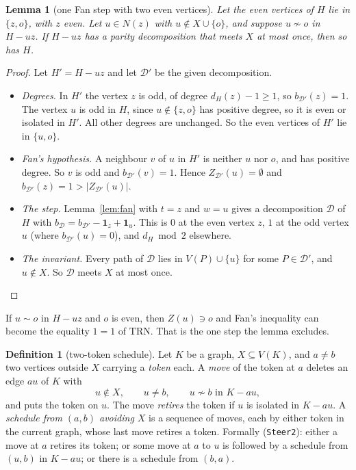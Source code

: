 \documentclass[11pt]{amsart}
\newtheorem{lemma}[theorem]{Lemma}
\theoremstyle{definition}
\newtheorem{definition}[theorem]{Definition}
\newcommand{\cD}{\mathcal D}
\newcommand{\lean}[1]{\quad{\footnotesize[Lean: \texttt{#1}]}}
\newcommand{\TRN}{\mathrm{TRN}}
\begin{document}
\begin{lemma}[one Fan step with two even vertices]\label{lem:step2}
Let the even vertices of $H$ lie in $\{z,o\}$, with $z$ even. Let $u\in N(z)$ with $u\notin X\cup
\{o\}$, and suppose $u\not\sim o$ in $H-uz$. If $H-uz$ has a parity decomposition that meets $X$ at
most once, then so has $H$.\lean{fan\_step\_two}
\end{lemma}

\begin{proof}
Let $H'=H-uz$ and let $\cD'$ be the given decomposition.
\begin{itemize}
\item \emph{Degrees.} In $H'$ the vertex $z$ is odd, of degree $d_H(z)-1\ge1$, so $b_{\cD'}(z)=1$.
The vertex $u$ is odd in $H$, since $u\notin\{z,o\}$ has positive degree, so it is even or isolated
in $H'$. All other degrees are unchanged. So the even vertices of $H'$ lie in $\{u,o\}$.
\item \emph{Fan's hypothesis.} A neighbour $v$ of $u$ in $H'$ is neither $u$ nor $o$, and has
positive degree. So $v$ is odd and $b_{\cD'}(v)=1$. Hence $Z_{\cD'}(u)=\emptyset$ and
$b_{\cD'}(z)=1>|Z_{\cD'}(u)|$.
\item \emph{The step.} Lemma~\ref{lem:fan} with $t=z$ and $w=u$ gives a decomposition $\cD$ of $H$
with $b_\cD=b_{\cD'}-\mathbf 1_z+\mathbf 1_u$. This is $0$ at the even vertex $z$, $1$ at the odd
vertex $u$ (where $b_{\cD'}(u)=0$), and $d_H\bmod2$ elsewhere.
\item \emph{The invariant.} Every path of $\cD$ lies in $V(P)\cup\{u\}$ for some $P\in\cD'$, and
$u\notin X$. So $\cD$ meets $X$ at most once.\qedhere
\end{itemize}
\end{proof}

If $u\sim o$ in $H-uz$ and $o$ is even, then $Z(u)\ni o$ and Fan's inequality can become the equality $1=1$ of
$\TRN$. That is the one step the lemma excludes.

\begin{definition}[two-token schedule]\label{def:sched}
Let $K$ be a graph, $X\subseteq V(K)$, and $a\ne b$ two vertices outside $X$ carrying a
\emph{token} each. A \emph{move} of the token at $a$ deletes an edge $au$ of $K$ with
\[
u\notin X,\qquad u\ne b,\qquad u\not\sim b\text{ in }K-au,
\]
and puts the token on $u$. The move \emph{retires} the token if $u$ is isolated in $K-au$. A
\emph{schedule from $(a,b)$ avoiding $X$} is a sequence of moves, each by either token in the current
graph, whose last move retires a token. Formally (\texttt{Steer2}): either a move at $a$ retires its
token; or some move at $a$ to $u$ is followed by a schedule from $(u,b)$ in $K-au$; or there is a
schedule from $(b,a)$.\lean{Steer2}
\end{definition}
\end{document}
